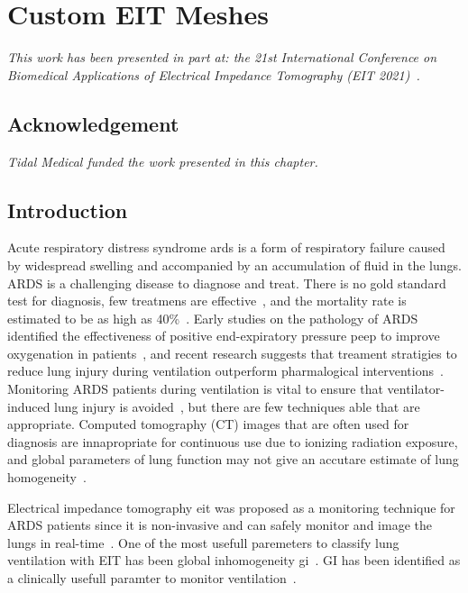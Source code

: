 \chapter{Custom EIT Meshes}
\label{chap:chapter-5}

\emph{This work has been presented in part at: 
 the 21st International Conference on Biomedical 
 Applications of Electrical Impedance Tomography (EIT 2021)~\parencite{stowe_generating_2021}.} 

\section*{Acknowledgement}
\emph{Tidal Medical funded the work presented in this chapter.}

\section{Introduction}
Acute respiratory distress syndrome \acrshort{ards} is a form of
respiratory failure caused by widespread swelling and 
accompanied by an accumulation of fluid in the 
lungs. 
ARDS is a challenging disease to diagnose and treat. 
There is no gold standard test for diagnosis, few treatmens are 
effective~\parencite{pham_fifty_2017}, and the 
mortality rate is estimated to be as high 
as 40\%~\parencite{abe_epidemiology_2018}.
Early studies on the pathology of ARDS identified 
the effectiveness of positive end-expiratory pressure
\acrshort{peep} to improve oxygenation in 
patients~\parencite{petty_cards_2001,ashbaugh_acute_1967}, 
and recent research suggests that treament stratigies to 
reduce lung injury during ventilation outperform
pharmalogical interventions~\parencite{duggal_pharmacological_2015}. 
Monitoring ARDS patients during ventilation is vital to ensure that 
ventilator-induced lung injury is avoided~\parencite{bates_ventilator-induced_2018}, 
but there are few techniques able
that are appropriate. Computed tomography (CT) images that are often used for
diagnosis are innapropriate for continuous use due to ionizing radiation 
exposure, and global parameters of lung function may not give an accutare 
estimate of lung homogeneity~\parencite{zhao_evaluation_2009}. 

Electrical impedance tomography \acrshort{eit} was proposed
as a monitoring technique for ARDS patients since it is non-invasive 
and can safely monitor and image the lungs in 
real-time~\parencite{denai_absolute_2010,frerichs_chest_2017}.
One of the most usefull paremeters to classify lung ventilation 
with EIT has been global inhomogeneity 
\acrshort{gi}~\parencite{sribar_influence_2020,hough_effect_2016,humphreys_effect_2011,
zhao_regional_2012,hochhausen_comparison_2019,hsu_regional_2017}.
GI has been identified as a clinically usefull paramter to monitor 
ventilation~\parencite{frerichs_chest_2019}.

